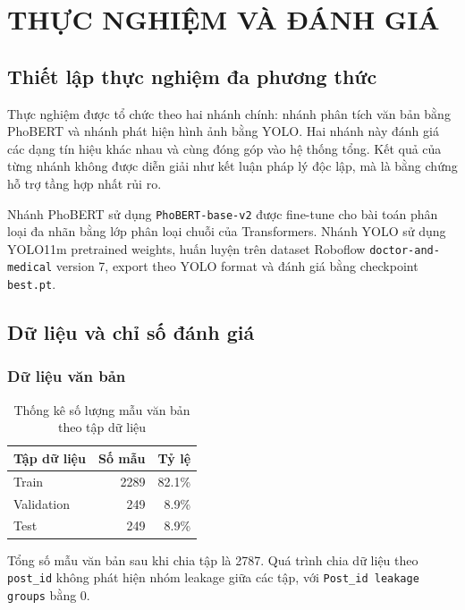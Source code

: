\chapter{THỰC NGHIỆM VÀ ĐÁNH GIÁ}

\section{Thiết lập thực nghiệm đa phương thức}
Thực nghiệm được tổ chức theo hai nhánh chính: nhánh phân tích văn bản bằng PhoBERT và nhánh phát hiện hình ảnh bằng YOLO. Hai nhánh này đánh giá các dạng tín hiệu khác nhau và cùng đóng góp vào hệ thống tổng. Kết quả của từng nhánh không được diễn giải như kết luận pháp lý độc lập, mà là bằng chứng hỗ trợ tầng hợp nhất rủi ro.

Nhánh PhoBERT sử dụng \texttt{PhoBERT-base-v2} được fine-tune cho bài toán phân loại đa nhãn bằng lớp phân loại chuỗi của Transformers. Nhánh YOLO sử dụng YOLO11m pretrained weights, huấn luyện trên dataset Roboflow \texttt{doctor-and-medical} version 7, export theo YOLO format và đánh giá bằng checkpoint \texttt{best.pt}.

\section{Dữ liệu và chỉ số đánh giá}
\subsection{Dữ liệu văn bản}
\begin{table}[H]
\centering
\caption{Thống kê số lượng mẫu văn bản theo tập dữ liệu}
\label{tab:text_split_stats}
\begin{tabular}{|l|r|r|}
\hline
\textbf{Tập dữ liệu} & \textbf{Số mẫu} & \textbf{Tỷ lệ} \\
\hline
Train & 2289 & 82.1\% \\ \hline
Validation & 249 & 8.9\% \\ \hline
Test & 249 & 8.9\% \\ \hline
\end{tabular}
\end{table}

Tổng số mẫu văn bản sau khi chia tập là 2787. Quá trình chia dữ liệu theo \texttt{post\_id} không phát hiện nhóm leakage giữa các tập, với \texttt{Post\_id leakage groups} bằng 0.

